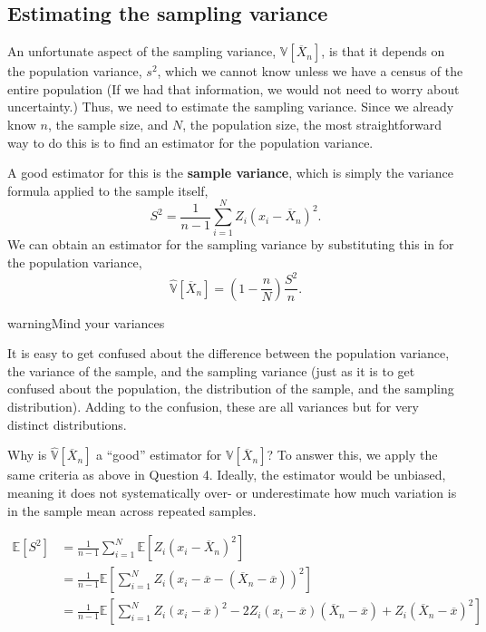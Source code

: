 \documentclass[
  13pt,
  letterpaper,
  DIV=11,
  numbers=noendperiod]{scrreprt}
\newcommand{\E}{\mathbb{E}}
\newcommand{\V}{\mathbb{V}}
\newcommand{\Xbar}{\overline{X}}
\theoremstyle{plain}
\theoremstyle{plain}
\theoremstyle{definition}
\theoremstyle{definition}
\theoremstyle{remark}
\begin{document}
\subsection{Estimating the sampling
variance}\label{estimating-the-sampling-variance}

An unfortunate aspect of the sampling variance, \(\V[\Xbar_n]\), is that
it depends on the population variance, \(s^2\), which we cannot know
unless we have a census of the entire population (If we had that
information, we would not need to worry about uncertainty.) Thus, we
need to estimate the sampling variance. Since we already know \(n\), the
sample size, and \(N\), the population size, the most straightforward
way to do this is to find an estimator for the population variance.

A good estimator for this is the \textbf{sample variance}, which is
simply the variance formula applied to the sample itself, \[
S^2 = \frac{1}{n-1} \sum_{i=1}^N Z_i(x_i - \Xbar_n)^2.
\] We can obtain an estimator for the sampling variance by substituting
this in for the population variance, \[
\widehat{\V}[\Xbar_n] = \left(1 - \frac{n}{N}\right)\frac{S^2}{n}.
\]

\begin{bookcallout}{warning}{Mind your variances}

It is easy to get confused about the difference between the population
variance, the variance of the sample, and the sampling variance (just as
it is to get confused about the population, the distribution of the
sample, and the sampling distribution). Adding to the confusion, these
are all variances but for very distinct distributions.

\end{bookcallout}

Why is \(\widehat{\V}[\Xbar_n]\) a ``good'' estimator for
\(\V[\Xbar_{n}]\)? To answer this, we apply the same criteria as above
in Question 4. Ideally, the estimator would be unbiased, meaning it does
not systematically over- or underestimate how much variation is in the
sample mean across repeated samples.

\[
\begin{aligned}
\E[S^2] &= \frac{1}{n-1} \sum_{i=1}^N \E[Z_i(x_i - \Xbar_n)^2] \\
&= \frac{1}{n-1}  \E\left[\sum_{i=1}^N Z_i(x_i - \overline{x} - (\Xbar_n - \overline{x}))^2\right] \\
&= \frac{1}{n-1}  \E\left[\sum_{i=1}^N Z_i(x_i - \overline{x})^2 -2Z_i(x_i - \overline{x})(\Xbar_n - \overline{x}) + Z_i(\Xbar_n - \overline{x})^2\right] \\
\end{aligned}
\]
\end{document}
